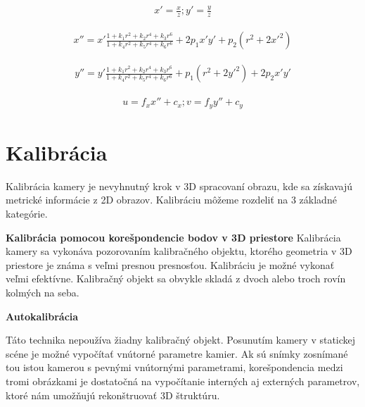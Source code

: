 \begin{equation}
\label{eq::real_camera::b}
\begin{aligned}
x'= \frac{x}{z}; y'= \frac{y}{z}
\end{aligned}
\end{equation}

\begin{equation}
\label{eq::real_camera::d}
\begin{aligned}
x''= x' \frac{1 + k_{1}r^{2} + k_{2}r^{4} + k_{3}r^{6}}{1 + k_{4}r^{2} + k_{5}r^{4} + k_{6}r^{6}} + 2p_{1}x'y' + p_{2}\left(r^{2} + 2x'^{2}\right)
\end{aligned}
\end{equation}

\begin{equation}
\label{eq::real_camera::e}
\begin{aligned}
y''= y' \frac{1 + k_{1}r^{2} + k_{2}r^{4} + k_{3}r^{6}}{1 + k_{4}r^{2} + k_{5}r^{4} + k_{6}r^{6}} + p_{1}\left(r^{2} + 2y'^{2}\right) + 2p_{2}x'y'
\end{aligned}
\end{equation}


\begin{equation}
\label{eq::tangential_dist::f}
\begin{aligned}
u = f_{x} x'' + c_{x}; v = f_{y} y'' + c_{y}
\end{aligned}
\end{equation}


\section{Kalibrácia}

Kalibrácia kamery je nevyhnutný krok v 3D spracovaní obrazu, kde sa získavajú metrické informácie z 2D obrazov. Kalibráciu môžeme rozdeliť na 3 základné kategórie.

\textbf{Kalibrácia pomocou korešpondencie bodov v 3D priestore}\newline
Kalibrácia kamery sa vykonáva pozorovaním kalibračného objektu, ktorého geometria v 3D priestore je známa s veľmi presnou presnosťou. Kalibráciu je možné vykonať veľmi efektívne. Kalibračný objekt sa obvykle skladá z dvoch alebo troch rovín kolmých na seba.

\textbf{Autokalibrácia} 

Táto technika nepoužíva žiadny kalibračný objekt. Posunutím kamery v statickej scéne je možné vypočítať vnútorné parametre kamier. Ak sú snímky zosnímané tou istou kamerou s pevnými vnútornými parametrami, korešpondencia medzi tromi obrázkami je dostatočná na vypočítanie interných aj externých parametrov, ktoré nám umožňujú rekonštruovať 3D štruktúru. 

